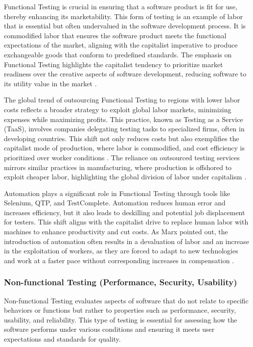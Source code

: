 \begin{refsection}
Functional Testing is crucial in ensuring that a software product is fit for use, thereby enhancing its marketability. This form of testing is an example of labor that is essential but often undervalued in the software development process. It is commodified labor that ensures the software product meets the functional expectations of the market, aligning with the capitalist imperative to produce exchangeable goods that conform to predefined standards. The emphasis on Functional Testing highlights the capitalist tendency to prioritize market readiness over the creative aspects of software development, reducing software to its utility value in the market \cite[pp.~220-225]{braverman1974labor}.

The global trend of outsourcing Functional Testing to regions with lower labor costs reflects a broader strategy to exploit global labor markets, minimizing expenses while maximizing profits. This practice, known as Testing as a Service (TaaS), involves companies delegating testing tasks to specialized firms, often in developing countries. This shift not only reduces costs but also exemplifies the capitalist mode of production, where labor is commodified, and cost efficiency is prioritized over worker conditions \cite[pp.~180-185]{fuchs2014digital}. The reliance on outsourced testing services mirrors similar practices in manufacturing, where production is offshored to exploit cheaper labor, highlighting the global division of labor under capitalism \cite[pp.~99-102]{kaner1999testing}.

Automation plays a significant role in Functional Testing through tools like Selenium, QTP, and TestComplete. Automation reduces human error and increases efficiency, but it also leads to deskilling and potential job displacement for testers. This shift aligns with the capitalist drive to replace human labor with machines to enhance productivity and cut costs. As Marx pointed out, the introduction of automation often results in a devaluation of labor and an increase in the exploitation of workers, as they are forced to adapt to new technologies and work at a faster pace without corresponding increases in compensation \cite[pp.~492-497]{marx2008capital}.

\subsubsection{Non-functional Testing (Performance, Security, Usability)}

Non-functional Testing evaluates aspects of software that do not relate to specific behaviors or functions but rather to properties such as performance, security, usability, and reliability. This type of testing is essential for assessing how the software performs under various conditions and ensuring it meets user expectations and standards for quality.


\end{refsection}
